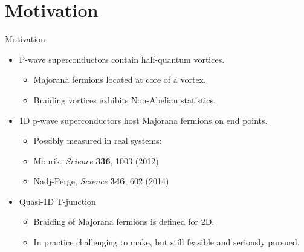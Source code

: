 \documentclass[xcolor=dvipsnames,10pt,aspectratio=169]{beamer}
\newcommand{\MO}{Motivation}
\begin{document}
  \section{\MO}
  \begin{frame}{\MO}{}

    \begin{multicols}{2}

    \begin{itemize}
      \item P-wave superconductors contain half-quantum vortices.
        \begin{itemize}
          \item Majorana fermions located at core of a vortex.
          \item Braiding vortices exhibits Non-Abelian statistics.
        \end{itemize}
      \item 1D p-wave superconductors host Majorana fermions on end points.
        \begin{itemize}
          \item Possibly measured in real systems:
          \item[] \hspace{0.40em}\scriptsize Mourik, \textit{Science} \textbf{336}, 1003 (2012)
          \item[] \hspace{0.50em}\scriptsize Nadj-Perge, \textit{Science} \textbf{346}, 602 (2014)
        \end{itemize}
      \item Quasi-1D T-junction
        \begin{itemize}
          \item Braiding of Majorana fermions is defined for 2D.
          \item In practice challenging to make, but still feasible and seriously pursued.
        \end{itemize}
    \end{itemize}

    \begin{figure}
      \end{figure}
    \end{multicols}

  \end{frame}
\end{document}
